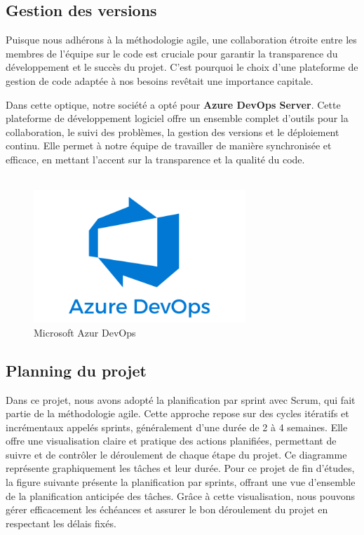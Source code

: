 \subsection{Gestion des versions}

Puisque nous adhérons à la méthodologie agile, une collaboration étroite entre les membres de l'équipe sur le code est cruciale pour garantir la transparence du développement et le succès du projet. C'est pourquoi le choix d'une plateforme de gestion de code adaptée à nos besoins revêtait une importance capitale.

Dans cette optique, notre société a opté pour \textbf{Azure DevOps Server}. Cette plateforme de développement logiciel offre un ensemble complet d'outils pour la collaboration, le suivi des problèmes, la gestion des versions et le déploiement continu. Elle permet à notre équipe de travailler de manière synchronisée et efficace, en mettant l'accent sur la transparence et la qualité du code.
\\
\\
\begin{figure}[H] 
    \centering
    \includegraphics[width=8cm]{Figures/azur.png}
    \caption{Microsoft Azur DevOps}
\end{figure}


\subsection{Planning du projet}

\hspace{\parindent}Dans ce projet, nous avons adopté la planification par sprint avec Scrum, qui fait partie de la méthodologie agile. Cette approche repose sur des cycles itératifs et incrémentaux appelés sprints, généralement d'une durée de 2 à 4 semaines. Elle offre une visualisation claire et pratique des actions planifiées, permettant de suivre et de contrôler le déroulement de chaque étape du projet. Ce diagramme représente graphiquement les tâches et leur durée. Pour ce projet de fin d’études, la figure suivante présente la planification par sprints, offrant une vue d'ensemble de la planification anticipée des tâches. Grâce à cette visualisation, nous pouvons gérer efficacement les échéances et assurer le bon déroulement du projet en respectant les délais fixés.


